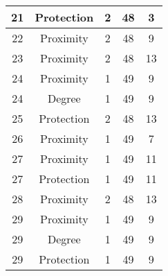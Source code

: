 \documentclass[results.tex]{subfiles}
\begin{document}
\begin{center}
\begin{tabular}{| c || c | c | c | c |}
            \hline
            21                      & Protection                   & 2                      & 48                      & 3                    \\
            \hline
            22                      & Proximity                    & 2                      & 48                      & 9                    \\
            \hline
            23                      & Proximity                    & 2                      & 48                      & 13                   \\
            \hline
            24                      & Proximity                    & 1                      & 49                      & 9                    \\
            \hline
            24                      & Degree                       & 1                      & 49                      & 9                    \\
            \hline
            25                      & Protection                   & 2                      & 48                      & 13                   \\
            \hline
            26                      & Proximity                    & 1                      & 49                      & 7                    \\
            \hline
            27                      & Proximity                    & 1                      & 49                      & 11                   \\
            \hline
            27                      & Protection                   & 1                      & 49                      & 11                   \\
            \hline
            28                      & Proximity                    & 2                      & 48                      & 13                   \\
            \hline
            29                      & Proximity                    & 1                      & 49                      & 9                    \\
            \hline
            29                      & Degree                       & 1                      & 49                      & 9                    \\
            \hline
            29                      & Protection                   & 1                      & 49                      & 9                    \\

\end{tabular}
\end{center}
\end{document}
